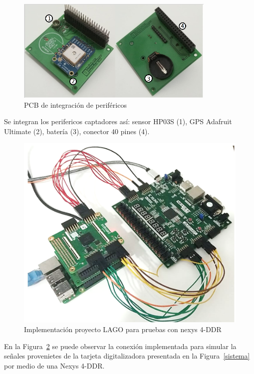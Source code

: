 \begin{figure}[H]
\includegraphics[width=0.85\textwidth]{Figs/pcb.PNG} 
\centering
\caption{PCB de integración de periféricos}
\label{pcb}
\end{figure}

Se integran los perifericos captadores así: sensor HP03S (1), GPS Adafruit Ultimate (2), batería (3), conector 40 pines (4).

\begin{figure}[H]
\includegraphics[scale=0.75]{Figs/lagofinal.PNG} 
\centering
\caption{Implementación proyecto LAGO para pruebas con nexys 4-DDR}
\label{nexys}
\end{figure}
En la Figura~\ref{nexys} se puede observar la conexión implementada para simular la señales provenietes de la tarjeta digitalizadora presentada en la Figura~\ref{sistema}  por medio de una Nexys 4-DDR.


